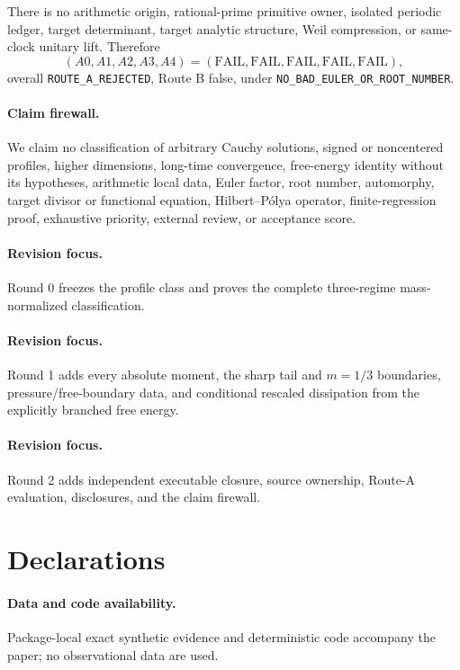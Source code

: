 \documentclass[9pt]{extarticle}
\begin{document}
There is no arithmetic origin, rational-prime primitive owner, isolated
periodic ledger, target determinant, target analytic structure, Weil
compression, or same-clock unitary lift.  Therefore
\[
 (A0,A1,A2,A3,A4)=(\mathrm{FAIL},\mathrm{FAIL},\mathrm{FAIL},
 \mathrm{FAIL},\mathrm{FAIL}),
\]
overall \texttt{ROUTE\_A\_REJECTED}, Route B false, under
\texttt{NO\_BAD\_EULER\_OR\_ROOT\_NUMBER}.

\paragraph{Claim firewall.}
We claim no classification of arbitrary Cauchy solutions, signed or
noncentered profiles, higher dimensions, long-time convergence, free-energy
identity without its hypotheses, arithmetic local data, Euler factor, root
number, automorphy, target divisor or functional equation, Hilbert--P\'olya
operator, finite-regression proof, exhaustive priority, external review, or
acceptance score.
\fi

\ifcase\CRevisionRound
\paragraph{Revision focus.} Round 0 freezes the profile class and proves the
complete three-regime mass-normalized classification.
\or
\paragraph{Revision focus.} Round 1 adds every absolute moment, the sharp
tail and $m=1/3$ boundaries, pressure/free-boundary data, and conditional
rescaled dissipation from the explicitly branched free energy.
\or
\paragraph{Revision focus.} Round 2 adds independent executable closure,
source ownership, Route-A evaluation, disclosures, and the claim firewall.
\fi

\section*{Declarations}
\paragraph{Data and code availability.} Package-local exact synthetic evidence
and deterministic code accompany the paper; no observational data are used.
\end{document}
